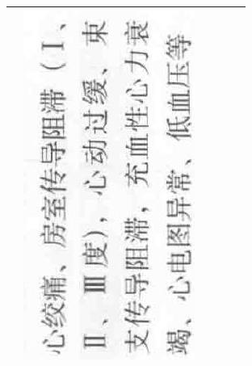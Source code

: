 \documentclass[10pt]{article}
\begin{document}
\begin{center}
\begin{tabular}{|c|c|c|c|c|c|}
 & \includegraphics[max width=\textwidth]{2024_07_05_645bb794a4d4f32ee0c8g-352(5)}
 \\
\hline

\end{tabular}
\end{center}
\end{document}

